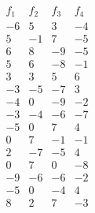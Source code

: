 $$\begin{array}{rrrr} 
f_1 & f_2 & f_3 & f_4 \\ 
\hline 
-6 &  5 &  3 & -4 \\ 
 5 & -1 &  7 & -5 \\ 
 6 &  8 & -9 & -5 \\ 
 5 &  6 & -8 & -1 \\ 
 3 &  3 &  5 &  6 \\ 
-3 & -5 & -7 &  3 \\ 
-4 &  0 & -9 & -2 \\ 
-3 & -4 & -6 & -7 \\ 
-5 &  0 &  7 &  4 \\ 
 0 &  7 & -1 & -1 \\ 
 2 & -7 & -5 &  4 \\ 
 0 &  7 &  0 & -8 \\ 
-9 & -6 & -6 & -2 \\ 
-5 &  0 & -4 &  4 \\ 
 8 &  2 &  7 & -3 \\ 
\end{array}$$ 
